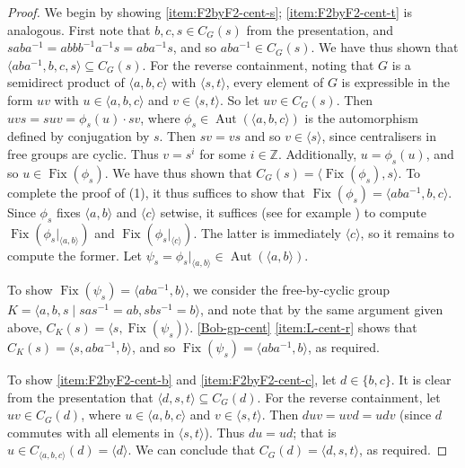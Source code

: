 \documentclass[11pt]{amsart}
\theoremstyle{definition}
\numberwithin{theorem}{section}
\DeclareMathOperator{\Fix}{Fix}
\DeclareMathOperator{\Aut}{Aut}
\newcommand{\Z}{\mathbb{Z}}
\begin{document}
	\begin{proof}
		We begin by showing \eqref{item:F2byF2-cent-s};
		\eqref{item:F2byF2-cent-t} is analogous. First note that \(b,c, s \in
		C_G(s)\) from the presentation, and \(saba^{-1} = abbb^{-1} a^{-1} s =
		aba^{-1}s\), and so \(aba^{-1} \in C_G(s)\). We have thus shown that
		\(\langle aba^{-1}, b, c, s \rangle \subseteq C_G(s)\). For the reverse
		containment, noting that \(G\) is a semidirect product of \(\langle a,
		b,c  \rangle\) with \(\langle s, t \rangle\), every element of \(G\) is
		expressible in the form \(uv\) with \(u \in \langle a, b, c \rangle\)
		and \(v \in \langle s, t \rangle\).  So let \(uv \in C_G(s)\). Then
		\(uvs = suv = \phi_s(u) \cdot sv\), where \(\phi_s \in \Aut(\langle a,
		b, c \rangle)\) is the automorphism defined by conjugation by \(s\).
		Then \(sv = vs\) and so \(v \in \langle s \rangle\), since centralisers
		in free groups are cyclic. Thus \(v = s^i\) for some \(i \in \Z\).
		Additionally, \(u = \phi_s(u)\), and so \(u \in \Fix(\phi_s)\). We have
		thus shown that \(C_G(s) = \langle \Fix(\phi_s), s \rangle\). To
		complete the proof of (1), it thus suffices to show that \(\Fix(\phi_s)
		= \langle aba^{-1}, b, c \rangle\). Since \(\phi_s\) fixes \(\langle a,
		b\rangle\) and \(\langle c \rangle\) setwise, it suffices (see for
		example \cite[Theorem 3.1]{MartinoVentura}) to compute
		\(\Fix(\phi_s|_{\langle a, b \rangle})\) and \(\Fix(\phi_s|_{\langle
		c\rangle})\).  The latter is immediately \(\langle c \rangle\), so it
		remains to compute the former. Let \(\psi_s = \phi_s|_{\langle a, b
		\rangle} \in \Aut(\langle a, b \rangle)\).

		To show \(\Fix(\psi_s) = \langle aba^{-1}, b \rangle\), we consider the
		free-by-cyclic group \(K = \langle a, b, s \mid sas^{-1} = ab, sbs^{-1}
		= b\rangle\), and note that by the same argument given above, \(C_K(s)
		= \langle s, \Fix(\psi_s)\rangle\). \cref{Bob-gp-cent}
		\eqref{item:L-cent-r} shows that \(C_K(s) = \langle s, aba^{-1}, b\rangle\),
		and so \(\Fix(\psi_s) = \langle aba^{-1}, b \rangle\), as required.

		To show \eqref{item:F2byF2-cent-b} and \eqref{item:F2byF2-cent-c}, let
		\(d \in \{b, c\}\). It is clear from the presentation that
		\(\langle d, s, t \rangle \subseteq C_G(d)\). For the reverse
		containment, let \(uv \in C_G(d)\), where \(u \in \langle a, b, c
		\rangle\) and \(v \in \langle s, t \rangle\). Then \(duv = uvd
		= udv\) (since \(d\) commutes with all elements in \(\langle s, t
		\rangle\)). Thus \(du = ud\); that is \(u \in C_{\langle a, b, c
		\rangle}(d) = \langle d \rangle\). We can conclude that
		\(C_G(d) = \langle d, s, t \rangle\), as required.


\end{proof}
\end{document}
